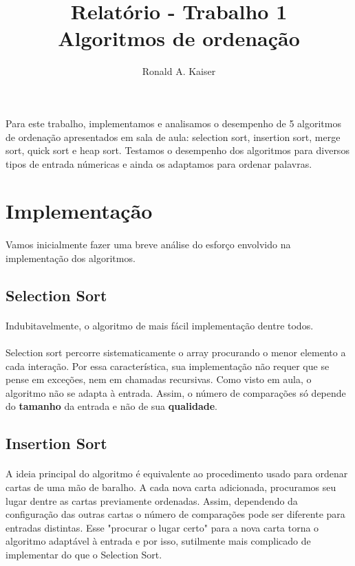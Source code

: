 \documentclass[11pt,a4paper]{article}
\title{Relatório - Trabalho 1 \\ Algoritmos de ordenação}
\author{Ronald A. Kaiser}
\begin{document}
    \maketitle

    \paragraph{}
    Para este trabalho, implementamos e analisamos o desempenho de 5 algoritmos de ordenação apresentados em sala de aula: selection sort, insertion sort, merge sort, quick sort e heap sort. Testamos o desempenho dos algoritmos para diversos tipos de entrada númericas e ainda os adaptamos para ordenar palavras.

    \section{Implementação}
        \paragraph{}
        Vamos inicialmente fazer uma breve análise do esforço envolvido na implementação dos algoritmos.


        \subsection{Selection Sort}
            \paragraph{}
            Indubitavelmente, o algoritmo de mais fácil implementação dentre todos.
            \paragraph {}
            Selection sort percorre sistematicamente o array procurando o menor elemento a cada interação. Por essa característica, sua implementação não requer que se pense em exceções, nem em chamadas recursivas. Como visto em aula, o algoritmo não se adapta à entrada. Assim, o número de comparações só depende do \textbf{tamanho} da entrada e não de sua \textbf{qualidade}. 
            

        \subsection{Insertion Sort}
        \paragraph{}
        A ideia principal do algoritmo é equivalente ao procedimento usado para ordenar cartas de uma mão de baralho. A cada nova carta adicionada, procuramos seu lugar dentre as cartas previamente ordenadas. Assim, dependendo da configuração das outras cartas o número de comparações pode ser diferente para entradas distintas. Esse "procurar o lugar certo" para a nova carta torna o algoritmo adaptável à entrada e por isso, sutilmente mais complicado de implementar do que o Selection Sort.
\end{document}
